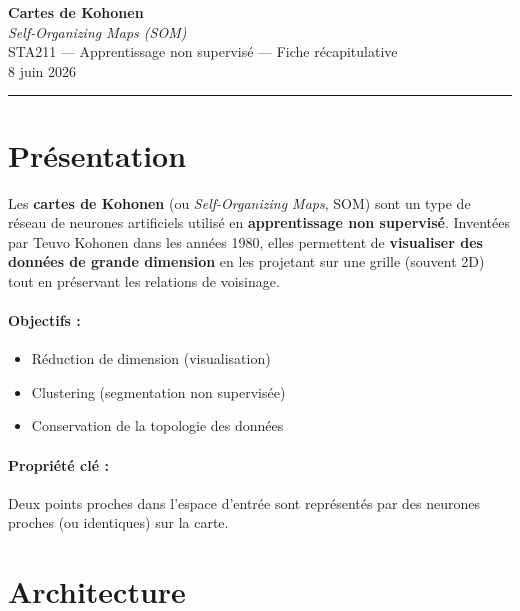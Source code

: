 \documentclass[a4paper,11pt]{article}
\theoremstyle{definition}
\begin{document}
\begin{center}
{\LARGE\textbf{Cartes de Kohonen}} \\
{\large \textit{Self-Organizing Maps (SOM)}} \\
\vspace{0.3cm}
STA211 — Apprentissage non supervisé — Fiche récapitulative \\
8 juin 2026
\end{center}

\vspace{0.5cm}
\rule{\textwidth}{0.4pt}
\vspace{0.5cm}

\tableofcontents
\newpage

\section{Présentation}

Les \textbf{cartes de Kohonen} (ou \textit{Self-Organizing Maps}, SOM) sont un type de réseau de neurones artificiels utilisé en \textbf{apprentissage non supervisé}. Inventées par Teuvo Kohonen dans les années 1980, elles permettent de \textbf{visualiser des données de grande dimension} en les projetant sur une grille (souvent 2D) tout en préservant les relations de voisinage.

\paragraph{Objectifs :}
\begin{itemize}
    \item Réduction de dimension (visualisation)
    \item Clustering (segmentation non supervisée)
    \item Conservation de la topologie des données
\end{itemize}

\paragraph{Propriété clé :}
Deux points proches dans l'espace d'entrée sont représentés par des neurones proches (ou identiques) sur la carte.

\section{Architecture}
\end{document}
